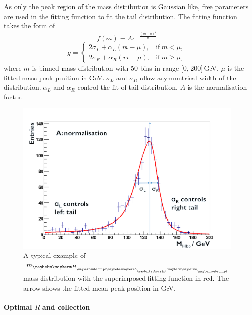 As only the peak region of the mass distribution is Gaussian like, free parameters are used in the fitting function to fit the tail distribution. The fitting function takes the form of
\begin{equation}
f(m)=A e^{- \frac{(m - \mu)^2}{g}}
\end{equation}
\begin{equation}
g=
\begin{cases}
2\sigma_L + \alpha_L(m - \mu), & \text{if}\ m < \mu,\\
2\sigma_R + \alpha_R(m - \mu), & \text{if}\ m \geqslant \mu,
\end{cases}
\end{equation}
where $m$ is binned mass distribution with 50 bins in range [0, 200]\,GeV. $\mu$ is the fitted mass peak position in GeV. $\sigma_L$ and $\sigma_R$ allow asymmetrical width of the distribution. $\alpha_L$ and  $\alpha_R$  control the fit of tail distribution.  $A$ is the normalisation factor.


\begin{figure}[!htbp]
\includegraphics[width=\largefigwidth]{doubleHiggs/MCmassFit}
\caption[Example MC mass fit for jet optimisation in double Higgs analysis]%
   {A typical example of  $m_{\Hbb}$  mass distribution with the superimposed fitting function in red. The arrow shows the fitted mean peak position in GeV.}
   \label{fig:doubleHiggsFitMCMass}
\end{figure}

\paragraph{Optimal $R$ and \PFO collection}

